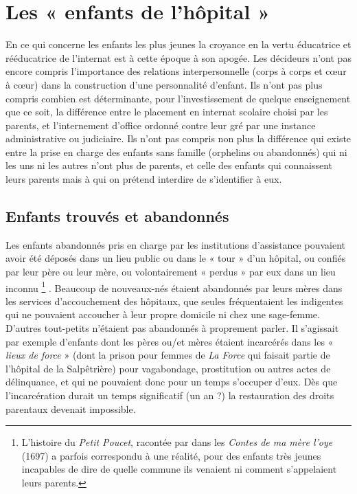 \section{Les « enfants de l'hôpital »}

 En ce qui concerne les enfants les plus jeunes la croyance en la vertu éducatrice et rééducatrice de l'internat est à cette époque à son apogée. Les décideurs n'ont pas encore compris l'importance des relations interpersonnelle (corps à corps et cœur à cœur) dans la construction d'une personnalité d'enfant. Ils n'ont pas plus compris combien est déterminante, pour l'investissement de quelque enseignement que ce soit, la différence entre le placement en internat scolaire choisi par les parents, et l'internement d'office ordonné contre leur gré par une instance administrative ou judiciaire. Ils n'ont pas compris non plus la différence qui existe entre la prise en charge des enfants sans famille (orphelins ou abandonnés) qui ni les uns ni les autres n'ont plus de parents, et celle des enfants qui connaissent leurs parents mais à qui on prétend interdire de s'identifier à eux. 


\subsection{Enfants trouvés et abandonnés}

Les enfants abandonnés pris en charge par les institutions d'assistance pouvaient avoir été déposés dans un lieu public ou dans le « tour » d'un hôpital, ou confiés par leur père ou leur mère, ou volontairement « perdus » par eux dans un lieu inconnu%
\footnote{L'histoire du \emph{Petit Poucet}, racontée par  dans les \emph{Contes de ma mère l'oye} (1697) a parfois correspondu à une réalité, pour des enfants très jeunes incapables de dire de quelle commune ils venaient ni comment s'appelaient leurs parents.}%
. Beaucoup de nouveaux-nés étaient abandonnés par leurs mères dans les services d'accouchement des hôpitaux, que seules fréquentaient les indigentes qui ne pouvaient accoucher à leur propre domicile ni chez une sage-femme. D'autres tout-petits n'étaient pas abandonnés à proprement parler. Il s'agissait par exemple d'enfants dont les pères ou/et mères étaient incarcérés dans les « \emph{lieux de force} » (dont la prison pour femmes de \emph{La Force} qui faisait partie de l'hôpital de la Salpêtrière) pour vagabondage, prostitution ou autres actes de délinquance, et qui ne pouvaient donc pour un temps s'occuper d'eux. Dès que l'incarcération durait un temps significatif (un an ?) la restauration des droits parentaux devenait impossible. 

